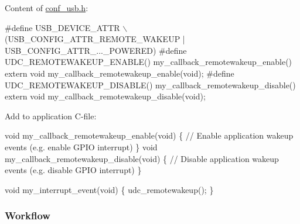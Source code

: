 Content of \hyperlink{conf__usb_8h}{conf\-\_\-usb.\-h}\-: 
\begin{DoxyCode}
\textcolor{preprocessor}{        #define  USB\_DEVICE\_ATTR \(\backslash\)}
\textcolor{preprocessor}{          (USB\_CONFIG\_ATTR\_REMOTE\_WAKEUP | USB\_CONFIG\_ATTR\_...\_POWERED)}
\textcolor{preprocessor}{}\textcolor{preprocessor}{        #define UDC\_REMOTEWAKEUP\_ENABLE() my\_callback\_remotewakeup\_enable()}
\textcolor{preprocessor}{}        \textcolor{keyword}{extern} \textcolor{keywordtype}{void} my\_callback\_remotewakeup\_enable(\textcolor{keywordtype}{void});
\textcolor{preprocessor}{        #define UDC\_REMOTEWAKEUP\_DISABLE() my\_callback\_remotewakeup\_disable()}
\textcolor{preprocessor}{        extern void my\_callback\_remotewakeup\_disable(void);}
\end{DoxyCode}


Add to application C-\/file\-: 
\begin{DoxyCode}
         \textcolor{keywordtype}{void} my\_callback\_remotewakeup\_enable(\textcolor{keywordtype}{void})
         \{
            \textcolor{comment}{// Enable application wakeup events (e.g. enable GPIO interrupt)}
         \}
         \textcolor{keywordtype}{void} my\_callback\_remotewakeup\_disable(\textcolor{keywordtype}{void})
         \{
            \textcolor{comment}{// Disable application wakeup events (e.g. disable GPIO interrupt)}
         \}

         \textcolor{keywordtype}{void} my\_interrupt\_event(\textcolor{keywordtype}{void})
         \{
            udc\_remotewakeup();
         \}
\end{DoxyCode}
\hypertarget{udc_use_case_3_udc_use_case_3_usage_flow}{}\subsubsection{Workflow}\label{udc_use_case_3_udc_use_case_3_usage_flow}


